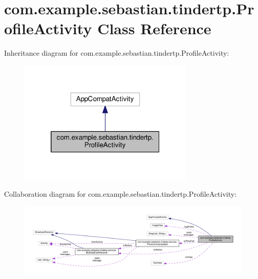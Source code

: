 \hypertarget{classcom_1_1example_1_1sebastian_1_1tindertp_1_1ProfileActivity}{}\section{com.\+example.\+sebastian.\+tindertp.\+Profile\+Activity Class Reference}
\label{classcom_1_1example_1_1sebastian_1_1tindertp_1_1ProfileActivity}


Inheritance diagram for com.\+example.\+sebastian.\+tindertp.\+Profile\+Activity\+:\nopagebreak
\begin{figure}[H]
\begin{center}
\leavevmode
\includegraphics[width=236pt]{classcom_1_1example_1_1sebastian_1_1tindertp_1_1ProfileActivity__inherit__graph}
\end{center}
\end{figure}


Collaboration diagram for com.\+example.\+sebastian.\+tindertp.\+Profile\+Activity\+:
\nopagebreak
\begin{figure}[H]
\begin{center}
\leavevmode
\includegraphics[width=350pt]{classcom_1_1example_1_1sebastian_1_1tindertp_1_1ProfileActivity__coll__graph}
\end{center}
\end{figure}
